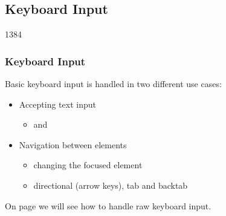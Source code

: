 %
%
%
%

\subsection{Keyboard Input}  

\begin{slide}{1384}\frametitle{Keyboard Input}

Basic keyboard input is handled in two different use cases:

\begin{itemize}
\item Accepting text input
  \begin{itemize}
  \item {} and 
  \end{itemize}
\item Navigation between elements
  \begin{itemize}
  \item changing the focused element
  \item directional (arrow keys), tab and backtab
  \end{itemize}
\end{itemize}

On page \pageref{raw_keyboard_input} we will see how to handle raw keyboard
input.
\end{slide}


